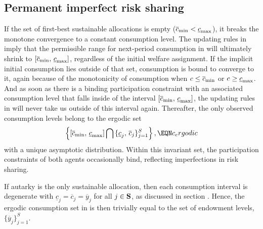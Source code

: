 \subsection{Permanent imperfect risk sharing}
If the set of first-best sustainable allocations is empty
($\overline c_{\rm min} < \underline c_{\rm max}$), it breaks the
 monotone convergence to a constant consumption level.
The updating rules in  imply that the permissible
range for next-period consumption in  will ultimately
shrink to $\left[\overline c_{\rm min},\, \underline c_{\rm
max}\right]$, regardless of the initial welfare assignment. If the
 implicit initial consumption lies outside of that set, consumption
is bound to converge to it, again because of the monotonicity of
consumption when $c \leq \overline c_{\rm min}$ or $c \geq
\underline c_{\rm max}$. And as soon as there is a binding
participation constraint with an associated consumption level that
falls inside of the interval $\left[\overline c_{\rm min},\,
\underline c_{\rm max}\right]$, the updating rules in
 will never take us outside of this interval again.
Thereafter, the only observed consumption levels belong to the
ergodic set
$$
\left\{\left[\overline c_{\rm min},\, \underline c_{\rm max}\right]
\bigcap \, \{\underline c_j,\, \overline c_j\}_{j=1}^S\right\}, \EQN c_ergodic
$$
with a unique asymptotic distribution. Within this invariant set,
the participation constraints of both agents occasionally bind,
reflecting imperfections in risk sharing.

If autarky is the only sustainable allocation, then each consumption
interval is degenerate with
$\underline c_j =\overline c_j = \overline y_j$ for all $j\in {\bf S}$,
as discussed in section . Hence, the ergodic
consumption set in  is then trivially equal to the set
of endowment levels, $\{\overline y_j\}_{j=1}^{S}$.



